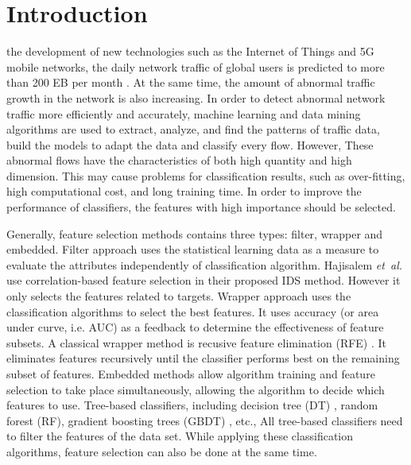 \documentclass{ieeeaccess}
\theoremstyle{definition}
\begin{document}
\titlepgskip=-15pt

\maketitle


\section{Introduction}
\label{sec:introduction}

 the development of new technologies such as the Internet of Things and 5G mobile networks, the daily network traffic of global users is predicted to more than 200 EB per month \cite{cisco-report}. 
At the same time, the amount of abnormal traffic growth in the network is also increasing. 
In order to detect abnormal network traffic more efficiently and accurately, machine learning and data mining algorithms are used to extract, analyze, and find the patterns of traffic data, build the models to adapt the data and classify every flow. 
However, These abnormal flows have the characteristics of both high quantity and high dimension. This may cause problems for classification results, such as over-fitting, high computational cost, and long training time. In order to improve the performance of classifiers, the features with high importance should be selected.

Generally, feature selection methods contains three types: filter, wrapper and embedded. Filter approach uses the statistical learning data as a measure to evaluate the attributes independently of classification algorithm\cite{Maza2018}. Hajisalem \emph{et~al.} \cite{Hajisalem2018} use correlation-based feature selection in their proposed IDS method. However it only selects the features related to targets. 
Wrapper approach uses the classification algorithms to select the best features. It uses accuracy (or area under curve, i.e. AUC) as a feedback to determine the effectiveness of feature subsets. A classical wrapper method is recusive feature elimination (RFE) \cite{RFE2002}. It eliminates features recursively until the classifier performs best on the remaining subset of features. 
Embedded methods allow algorithm training and feature selection to take place simultaneously, allowing the algorithm to decide which features to use. Tree-based classifiers, including decision tree (DT) \cite{quinlan2014c4}, random forest (RF)\cite{rf2002}, gradient boosting trees (GBDT) \cite{gbdt2001}, etc., All tree-based classifiers need to filter the features of the data set. While applying these classification algorithms, feature selection can also be done at the same time.
\end{document}
